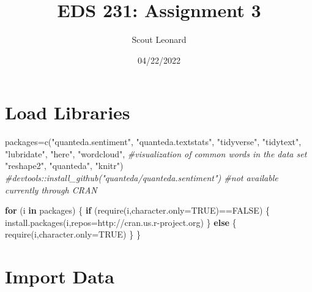 \documentclass[
]{article}
\title{EDS 231: Assignment 3}
\author{Scout Leonard}
\date{04/22/2022}
\newenvironment{Shaded}{\begin{snugshade}}{\end{snugshade}}
\newcommand{\AttributeTok}[1]{\textcolor[rgb]{0.77,0.63,0.00}{#1}}
\newcommand{\CommentTok}[1]{\textcolor[rgb]{0.56,0.35,0.01}{\textit{#1}}}
\newcommand{\ConstantTok}[1]{\textcolor[rgb]{0.00,0.00,0.00}{#1}}
\newcommand{\ControlFlowTok}[1]{\textcolor[rgb]{0.13,0.29,0.53}{\textbf{#1}}}
\newcommand{\FunctionTok}[1]{\textcolor[rgb]{0.00,0.00,0.00}{#1}}
\newcommand{\NormalTok}[1]{#1}
\newcommand{\OtherTok}[1]{\textcolor[rgb]{0.56,0.35,0.01}{#1}}
\newcommand{\SpecialCharTok}[1]{\textcolor[rgb]{0.00,0.00,0.00}{#1}}
\newcommand{\StringTok}[1]{\textcolor[rgb]{0.31,0.60,0.02}{#1}}
\begin{document}
\maketitle

\hypertarget{load-libraries}{%
\section{Load Libraries}\label{load-libraries}}

\begin{Shaded}
\begin{Highlighting}[]
\NormalTok{packages}\OtherTok{=}\FunctionTok{c}\NormalTok{(}\StringTok{"quanteda.sentiment"}\NormalTok{,}
           \StringTok{"quanteda.textstats"}\NormalTok{,}
           \StringTok{"tidyverse"}\NormalTok{,}
           \StringTok{"tidytext"}\NormalTok{,}
           \StringTok{"lubridate"}\NormalTok{,}
           \StringTok{"here"}\NormalTok{,}
           \StringTok{"wordcloud"}\NormalTok{, }\CommentTok{\#visualization of common words in the data set}
           \StringTok{"reshape2"}\NormalTok{,}
           \StringTok{"quanteda"}\NormalTok{,}
           \StringTok{"knitr"}\NormalTok{) }\CommentTok{\#devtools::install\_github("quanteda/quanteda.sentiment") \#not available currently through CRAN}

\ControlFlowTok{for}\NormalTok{ (i }\ControlFlowTok{in}\NormalTok{ packages) \{}
  \ControlFlowTok{if}\NormalTok{ (}\FunctionTok{require}\NormalTok{(i,}\AttributeTok{character.only=}\ConstantTok{TRUE}\NormalTok{)}\SpecialCharTok{==}\ConstantTok{FALSE}\NormalTok{) \{}
    \FunctionTok{install.packages}\NormalTok{(i,}\AttributeTok{repos=}\StringTok{\textquotesingle{}http://cran.us.r{-}project.org\textquotesingle{}}\NormalTok{)}
\NormalTok{  \}}
  \ControlFlowTok{else}\NormalTok{ \{}
    \FunctionTok{require}\NormalTok{(i,}\AttributeTok{character.only=}\ConstantTok{TRUE}\NormalTok{)}
\NormalTok{  \}}
\NormalTok{\}}
\end{Highlighting}
\end{Shaded}

\hypertarget{import-data}{%
\section{Import Data}\label{import-data}}
\end{document}
